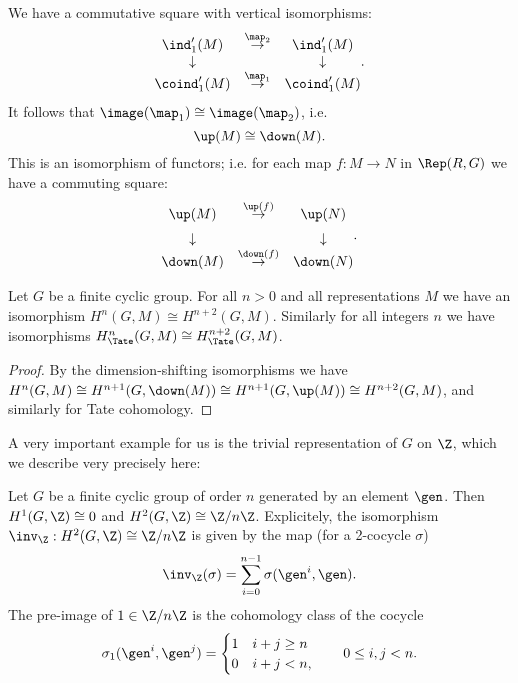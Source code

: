 \begin{definition} \label{def:up iso down}
We have a commutative square with vertical isomorphisms:
	\[
		\begin{matrix}
			\ind_1'(M) & \stackrel{\map_2}\to & \ind_1'(M) \\
			\downarrow && \downarrow \\
			\coind_1'(M) & \stackrel{\map_1}\to & \coind_1'(M) \\
		\end{matrix}.
	\]
	It follows that $\image(\map_1) \cong \image(\map_2)$,
	i.e.
	\[
		\up(M) \cong \down(M).
	\]
	This is an isomorphism of functors; i.e. for each map $f : M \to N$ in $\Rep(R,G)$
	we have a commuting square:
	\[
		\begin{matrix}
			\up(M) & \stackrel{\up(f)}\to & \up(N) \\[2mm]
			\downarrow && \downarrow \\
			\down(M) & \stackrel{\down(f)}\to & \down(N)
		\end{matrix}.
	\]
\end{definition}

\begin{corollary} \label{cor:periodic cohomology}
	Let $G$ be a finite cyclic group.
	For all $n > 0$ and all representations $M$
	we have an isomorphism $H^{n}(G,M) \cong H^{n+2}(G,M)$.
	Similarly for all integers $n$ we have isomorphisms $H^{n}_{\Tate}(G,M) \cong H^{n+2}_{\Tate}(G,M)$.
\end{corollary}

\begin{proof}
	By the dimension-shifting isomorphisms we have
	$H^{n}(G,M) \cong H^{n+1}(G,\down(M)) \cong H^{n+1}(G,\up(M)) \cong H^{n+2}(G,M)$,
	and similarly for Tate cohomology.
\end{proof}

A very important example for us is the trivial representation of $G$ on $\Z$, which we describe
very precisely here:

\begin{lemma} \label{lem:H2 cyclic Z}
	Let $G$ be a finite cyclic group of order $n$ generated by an element $\gen$.
	Then $H^1(G,\Z) \cong 0$ and $H^2(G,\Z) \cong \Z/n\Z$.
	Explicitely, the isomorphism $\inv_\Z : H^2(G,\Z) \cong \Z/n\Z$ is given by the map
	(for a 2-cocycle $\sigma$)
	\[
		\inv_\Z (\sigma) = \sum_{i=0}^{n-1} \sigma(\gen^i,\gen).
	\]
	The pre-image of $1 \in \Z/n\Z$ is the cohomology class of the cocycle
	\[
		\sigma_1 (\gen^i, \gen^j) = \begin{cases}
			1 & i+j \ge n \\
			0 & i+j < n,
		\end{cases}
		\qquad 0 \le i,j < n.
	\]
\end{lemma}

